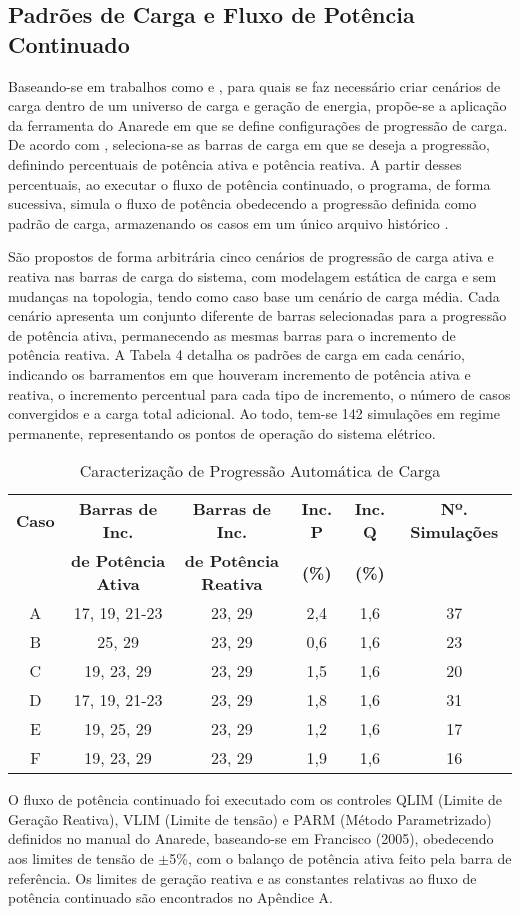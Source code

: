 \documentclass[12pt,oneside,a4paper,chapter=TITLE,section=TITLE,sumario=tradicional,english,brazil]{abntex2}
\begin{document}
\subsection{Padrões de Carga e Fluxo de Potência Continuado}
Baseando-se em trabalhos como \cite{chan1995} e \cite{kalyani2011}, para quais se faz necessário criar cenários de carga dentro de um universo de carga e geração de energia, propõe-se a aplicação da ferramenta do Anarede em que se define configurações de progressão de carga. De acordo com \textcite{Anatem}, seleciona-se as barras de carga em que se deseja a progressão, definindo percentuais de potência ativa e potência reativa. A partir desses percentuais, ao executar o fluxo de potência continuado, o programa, de forma sucessiva, simula o fluxo de potência obedecendo a progressão definida como padrão de carga, armazenando os casos em um único arquivo histórico \cite{Anatem}.\par  
São propostos de forma arbitrária cinco cenários de progressão de carga ativa e reativa nas barras de carga do sistema, com modelagem estática de carga e sem mudanças na topologia, tendo como caso base um cenário de carga média. Cada cenário apresenta um conjunto diferente de barras selecionadas para a progressão de potência ativa, permanecendo as mesmas barras para o incremento de potência reativa. A Tabela 4 detalha os padrões de carga em cada cenário, indicando os barramentos em que houveram incremento de potência ativa e reativa, o incremento percentual para cada tipo de incremento, o número de casos convergidos e a carga total adicional. Ao todo, tem-se 142 simulações em regime permanente, representando os pontos de operação do sistema elétrico. \par
\begin{table}[h]
\centering
\caption{Caracterização de Progressão Automática de Carga}
\begin{tabular}{c|c|c|c|c|c}
\textbf{Caso}&\textbf{Barras de Inc.}&\textbf{Barras de Inc.}&\textbf{Inc. P}&\textbf{Inc. Q}&\textbf{Nº. Simulações}\\
&\textbf{de Potência Ativa}&\textbf{de Potência Reativa}&\textbf{ (\%)}&\textbf{ (\%)}&\\
\hline
A &17, 19, 21-23&23, 29&2,4&1,6&37\\
\hline
B &25, 29&23, 29&0,6&1,6&23\\
\hline
C &19, 23, 29& 23, 29&1,5&1,6&20\\
\hline
D &17, 19, 21-23& 23, 29&1,8&1,6&31\\
\hline
E &19, 25, 29& 23, 29&1,2&1,6&17\\
\hline
F &19, 23, 29& 23, 29&1,9&1,6&16\\
\end{tabular}
\end{table}
\par
O fluxo de potência continuado foi executado com os controles QLIM (Limite de Geração Reativa), VLIM (Limite de tensão) e PARM (Método Parametrizado) definidos no manual do Anarede, baseando-se em Francisco (2005), obedecendo aos limites de tensão de $\pm$5\%, com o balanço de potência ativa feito pela barra de referência. Os limites de geração reativa e as constantes relativas ao fluxo de potência continuado são encontrados no  Apêndice A.\par 
\end{document}
